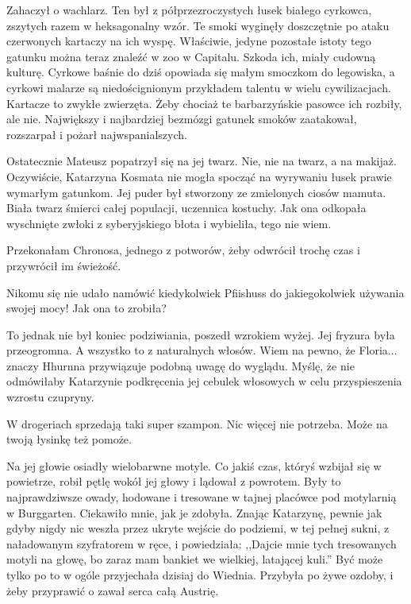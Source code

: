 Zahaczył o wachlarz.
Ten był z półprzezroczystych łusek białego cyrkowca, zszytych razem w heksagonalny wzór.
Te smoki wyginęły doszczętnie po ataku czerwonych kartaczy na ich wyspę.
Właściwie, jedyne pozostałe istoty tego gatunku można teraz znaleźć w zoo w Capitalu.
Szkoda ich, miały cudowną kulturę.
Cyrkowe baśnie do dziś opowiada się małym smoczkom do legowiska, a cyrkowi malarze są niedoścignionym przykładem talentu w wielu cywilizacjach.
Kartacze to zwykłe zwierzęta. Żeby chociaż te barbarzyńskie pasowce ich rozbiły, ale nie. 
Największy i najbardziej bezmózgi gatunek smoków zaatakował, rozszarpał i pożarł najwspanialszych.

Ostatecznie Mateusz popatrzył się na jej twarz.
Nie, nie na twarz, a na makijaż.
Oczywiście, Katarzyna Kosmata nie mogła spocząć na wyrywaniu łusek prawie wymarłym gatunkom.
Jej puder był stworzony ze zmielonych ciosów mamuta. Biała twarz śmierci całej populacji, uczennica kostuchy.
Jak ona odkopała wyschnięte zwłoki z syberyjskiego błota i wybieliła, tego nie wiem.
\begin{dialogue}
\ds{} Przekonałam Chronosa, jednego z potworów, żeby odwrócił trochę czas i przywrócił im świeżość.
\end{dialogue}

Nikomu się nie udało namówić kiedykolwiek Pfiishuss do jakiegokolwiek używania swojej mocy! Jak ona to zrobiła?

To jednak nie był koniec podziwiania, poszedł wzrokiem wyżej.
Jej fryzura była przeogromna. A wszystko to z naturalnych włosów. 
Wiem na pewno, że Floria... znaczy Hhurnna przywiązuje podobną uwagę do wyglądu. 
Myślę, że nie odmówiłaby Katarzynie podkręcenia jej cebulek włosowych w celu przyspieszenia wzrostu czupryny.
\begin{dialogue}
\ds{} W drogeriach sprzedają taki super szampon. Nic więcej nie potrzeba. Może na twoją łysinkę też pomoże. 
\end{dialogue}

Na jej głowie osiadły wielobarwne motyle. 
Co jakiś czas, któryś wzbijał się w powietrze, robił pętlę wokół jej głowy i lądował z powrotem.
Były to najprawdziwsze owady, hodowane i tresowane w tajnej placówce pod motylarnią w Burggarten.
Ciekawiło mnie, jak je zdobyła. Znając Katarzynę, pewnie jak gdyby nigdy nic weszła przez ukryte wejście do podziemi, w tej pełnej sukni, z naładowanym szyfratorem w ręce, i powiedziała:
,,Dajcie mnie tych tresowanych motyli na głowę, bo zaraz mam bankiet we wielkiej, latającej kuli.''
Być może tylko po to w ogóle przyjechała dzisiaj do Wiednia.
Przybyła po żywe ozdoby, i żeby przyprawić o zawał serca całą Austrię.

